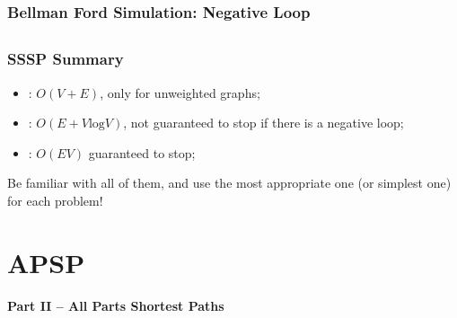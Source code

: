 \begin{frame}
  \frametitle{Bellman Ford Simulation: Negative Loop}
  \begin{center}
  \end{center}
  \vspace{10cm}
\end{frame}

\subsection{}
\begin{frame}
  \frametitle{SSSP Summary}
  \begin{itemize}
  \item {}: $O(V+E)$, only for unweighted graphs;\bigskip

  \item {}: $O(E+V\text{log}V)$, not guaranteed to stop if there is a negative loop;\bigskip

  \item {}: $O(EV)$ guaranteed to stop;
  \end{itemize}
  \bigskip

  Be familiar with all of them, and use the most appropriate one (or simplest one) for each problem!
\end{frame}


\section{APSP}

\begin{frame}
  \begin{center}
    {\bf Part II -- All Parts Shortest Paths}
  \end{center}
\end{frame}

